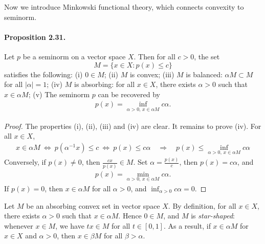 \documentclass{article}
\begin{document}
Now we introduce Minkowski functional theory, which connects convexity to seminorm.

\paragraph{Proposition 2.31.\label{prop:2.31}} Let $p$ be a seminorm on a vector space $X$. Then for all $c>0$, the set $$M=\{x\in X:p(x)\leq c\}$$ satisfies the following: (i) $0\in M$; (ii) $M$ is convex; (iii) $M$ is balanced: $\alpha M\subset M$ for all $\vert \alpha\vert = 1$; (iv) $M$ is absorbing: for all $x\in X$, there exists $\alpha>0$ such that $x\in\alpha M$; (v) The seminorm $p$ can be recovered by
	\begin{align*}
		p(x) = \inf_{\alpha > 0,\,x\in\alpha M}c\alpha.
	\end{align*}
\begin{proof}
The properties (i), (ii), (iii) and (iv) are clear. It remains to prove (iv). For all $x\in X$,
\begin{align*}
	x\in \alpha M\ \Leftrightarrow\ p(\alpha^{-1}x)\leq c\ \Leftrightarrow\ p(x)\leq c\alpha\quad\Rightarrow\quad p(x)\leq \inf_{\alpha > 0,\,x\in \alpha M}c\alpha
\end{align*}
Conversely, if $p(x)\neq 0$, then $\frac{cx}{p(x)}\in M$. Set $\alpha=\frac{p(x)}{c}$, then $p(x)=c\alpha$, and
\begin{align*}
	p(x) = \min_{\alpha>0,\,x\in \alpha M}c\alpha.
\end{align*}
If $p(x)=0$, then $x\in \alpha M$ for all $\alpha > 0$, and $\inf_{\alpha>0}c\alpha =0$.
\end{proof}

Let $M$ be an absorbing convex set in vector space $X$. By definition, for all $x\in X$, there exists $\alpha >0$ such that $x\in\alpha M$. Hence $0\in M$, and $M$ is \textit{star-shaped}: whenever $x\in M$, we have $tx\in M$ for all $t\in[0,1]$. As a result, if $x\in \alpha M$ for $x\in X$ and $\alpha >0$, then $x\in \beta M$ for all $\beta > \alpha$.
\end{document}

